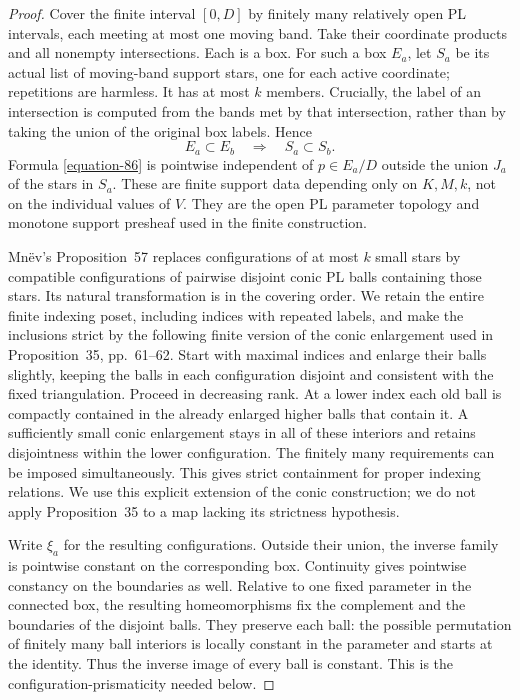 \documentclass[11pt,a4paper]{article}
\theoremstyle{definition}
\begin{document}
\begin{proof}
Cover the finite interval \([0,D]\) by finitely many relatively open
PL intervals, each meeting at most one moving band. Take their
coordinate products and all nonempty intersections. Each is a box.
For such a box \(E_a\), let \(S_a\) be its actual list of moving-band
support stars, one for each active coordinate; repetitions are harmless.
It has at most \(k\) members. Crucially, the label of an intersection
is computed from the bands met by that intersection, rather than
by taking the union of the original box labels. Hence
\begin{equation}
 E_a\subset E_b\quad\Longrightarrow\quad S_a\subset S_b .
 \label{equation-88}
\end{equation}
Formula \eqref{equation-86} is pointwise independent of \(p\in E_a/D\) outside
the union \(J_a\) of the stars in \(S_a\). These are finite support
data depending only on \(K,M,k\), not on the individual values of \(V\).
They are the open PL parameter topology and monotone support
presheaf used in the finite construction.

Mn\"ev's Proposition~57 replaces configurations of at most \(k\) small
stars by compatible configurations of pairwise disjoint conic PL balls
containing those stars. Its natural transformation is in the covering
order. We retain the entire finite indexing poset, including indices
with repeated labels, and make the inclusions strict by the following
finite version of the conic enlargement used in Proposition~35,
pp.~61--62. Start with maximal indices and enlarge their balls slightly,
keeping the balls in each configuration disjoint and consistent with
the fixed triangulation. Proceed in decreasing rank. At a lower
index each old ball is compactly contained in the already enlarged
higher balls that contain it. A sufficiently small conic enlargement
stays in all of these interiors and retains disjointness within the
lower configuration. The finitely many requirements can be imposed
simultaneously. This gives strict containment for proper indexing
relations. We use this explicit extension of the conic construction;
we do not apply Proposition~35 to a map lacking its strictness
hypothesis.

Write \(\xi_a\) for the resulting configurations. Outside their union,
the inverse family is pointwise constant on the corresponding box.
Continuity gives pointwise constancy on the boundaries as well.
Relative to one fixed parameter in the connected box, the resulting
homeomorphisms fix the complement and the boundaries of the disjoint
balls. They preserve each ball: the possible permutation of finitely
many ball interiors is locally constant in the parameter and starts
at the identity. Thus the inverse image of every ball is constant.
This is the configuration-prismaticity needed below.


\end{proof}
\end{document}
